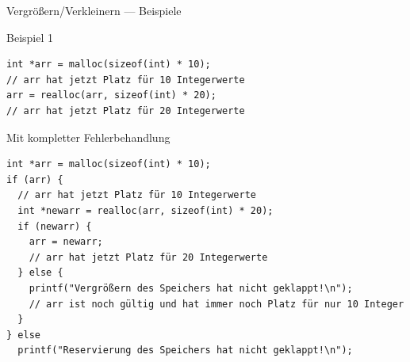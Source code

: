 \documentclass[presentation]{beamer}
\begin{document}
\begin{frame}[label={sec:orgb124b3b},fragile]{Vergrößern/Verkleinern  --- Beispiele}
 \begin{block}{Beispiel 1}
\begin{verbatim}
int *arr = malloc(sizeof(int) * 10);
// arr hat jetzt Platz für 10 Integerwerte
arr = realloc(arr, sizeof(int) * 20);
// arr hat jetzt Platz für 20 Integerwerte
\end{verbatim}
\end{block}
\begin{block}{Mit kompletter Fehlerbehandlung}
\begin{verbatim}
int *arr = malloc(sizeof(int) * 10);
if (arr) {
  // arr hat jetzt Platz für 10 Integerwerte
  int *newarr = realloc(arr, sizeof(int) * 20);
  if (newarr) {
    arr = newarr;
    // arr hat jetzt Platz für 20 Integerwerte
  } else {
    printf("Vergrößern des Speichers hat nicht geklappt!\n");
    // arr ist noch gültig und hat immer noch Platz für nur 10 Integer
  }
} else
  printf("Reservierung des Speichers hat nicht geklappt!\n");
\end{verbatim}
\end{block}
\end{frame}
\end{document}
